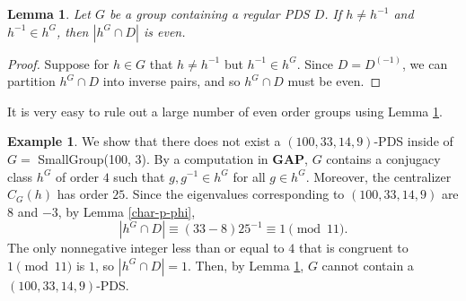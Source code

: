 \documentclass[12pt]{amsproc} %
\newtheorem{lem}[thm]{Lemma}
\theoremstyle{definition}\newtheorem{defn}[thm]{Definition}
\theoremstyle{definition}\newtheorem{rem}[thm]{Remark}
\theoremstyle{definition}\newtheorem{ex}[thm]{Example}
\newcommand{\GAP}{\textbf{{\rm GAP}}}
\begin{document}
\begin{lem}\label{order-2-action}
Let $G$ be a group containing a regular PDS $D$. If $h \neq h^{-1}$ and $h^{-1} \in h^G$, then $|h^G \cap D|$ is even.
\end{lem}
	\begin{proof}
		Suppose for $h \in G$ that $h \neq h^{-1}$ but $h^{-1} \in h^G$. Since $D = D^{(-1)}$, we can partition $h^G \cap D$ into inverse pairs, and so $h^G \cap D$ must be even.
	\end{proof}
	
It is very easy to rule out a large number of even order groups using Lemma \ref{order-2-action}.

\begin{ex}
We show that there does not exist a $(100, 33, 14, 9)$-PDS inside of $G =$ SmallGroup(100, 3). By a computation in \GAP \cite{GAP4}, $G$ contains a conjugacy class $h^G$ of order $4$ such that $g, g^{-1} \in h^G$ for all $g\in h^G$. Moreover, the centralizer $C_G(h)$ has order $25$. Since the eigenvalues corresponding to $(100, 33, 14, 9)$ are $8$ and $-3$, by Lemma \ref{char-p-phi},
\[|h^G \cap D| \equiv (33 - 8)25^{-1} \equiv 1 \pmod{11}.\] The only nonnegative integer less than or equal to $4$ that is congruent to $1 \pmod{11}$ is $1$, so $|h^G \cap D| = 1$. Then, by Lemma \ref{order-2-action}, $G$ cannot contain a $(100, 33, 14, 9)$-PDS.
\end{ex}
    
\end{document}
